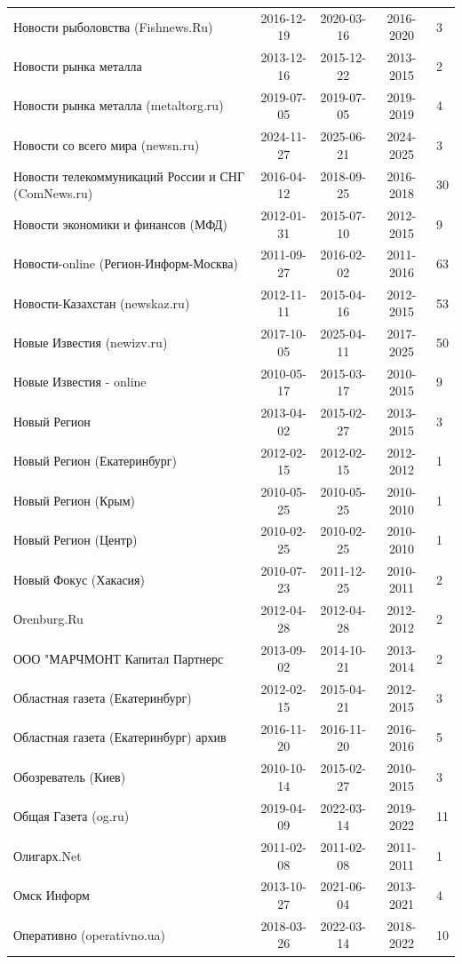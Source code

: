 \begin{longtable}{p{6cm}cccp{2cm}}
Новости рыболовства (Fishnews.Ru) & 2016-12-19 & 2020-03-16 & 2016-2020 & 3\\
Новости рынка металла & 2013-12-16 & 2015-12-22 & 2013-2015 & 2\\
Новости рынка металла (metaltorg.ru) & 2019-07-05 & 2019-07-05 & 2019-2019 & 4\\
Новости со всего мира (newsn.ru) & 2024-11-27 & 2025-06-21 & 2024-2025 & 3\\
Новости телекоммуникаций России и СНГ (ComNews.ru) & 2016-04-12 & 2018-09-25 & 2016-2018 & 30\\
Новости экономики и финансов (МФД) & 2012-01-31 & 2015-07-10 & 2012-2015 & 9\\
Новости-online (Регион-Информ-Москва) & 2011-09-27 & 2016-02-02 & 2011-2016 & 63\\
Новости-Казахстан (newskaz.ru) & 2012-11-11 & 2015-04-16 & 2012-2015 & 53\\
Новые Известия (newizv.ru) & 2017-10-05 & 2025-04-11 & 2017-2025 & 50\\
Новые Известия - online & 2010-05-17 & 2015-03-17 & 2010-2015 & 9\\
Новый Регион & 2013-04-02 & 2015-02-27 & 2013-2015 & 3\\
Новый Регион (Екатеринбург) & 2012-02-15 & 2012-02-15 & 2012-2012 & 1\\
Новый Регион (Крым) & 2010-05-25 & 2010-05-25 & 2010-2010 & 1\\
Новый Регион (Центр) & 2010-02-25 & 2010-02-25 & 2010-2010 & 1\\
Новый Фокус (Хакасия) & 2010-07-23 & 2011-12-25 & 2010-2011 & 2\\
Оrenburg.Ru & 2012-04-28 & 2012-04-28 & 2012-2012 & 2\\
ООО "МАРЧМОНТ Капитал Партнерс & 2013-09-02 & 2014-10-21 & 2013-2014 & 2\\
Областная газета (Екатеринбург) & 2012-02-15 & 2015-04-21 & 2012-2015 & 3\\
Областная газета (Екатеринбург) архив & 2016-11-20 & 2016-11-20 & 2016-2016 & 5\\
Обозреватель (Киев) & 2010-10-14 & 2015-02-27 & 2010-2015 & 3\\
Общая Газета (og.ru) & 2019-04-09 & 2022-03-14 & 2019-2022 & 11\\
Олигарх.Net & 2011-02-08 & 2011-02-08 & 2011-2011 & 1\\
Омск Информ & 2013-10-27 & 2021-06-04 & 2013-2021 & 4\\
Оперативно (operativno.ua) & 2018-03-26 & 2022-03-14 & 2018-2022 & 10\\

\end{longtable}
